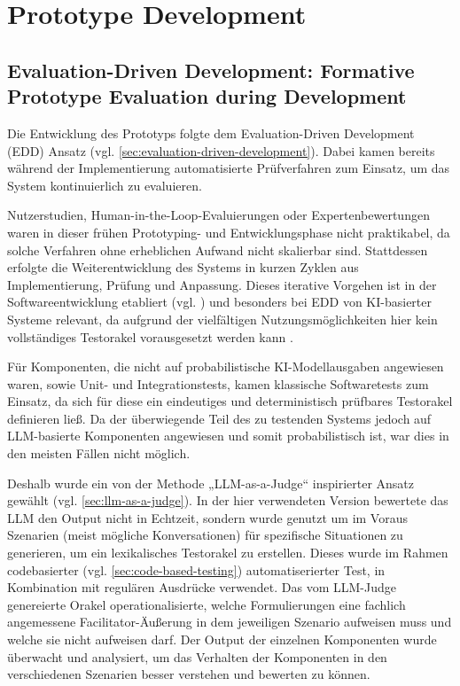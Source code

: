 \section{Prototype Development}

\subsection{Evaluation-Driven Development: Formative Prototype Evaluation during Development}
\label{sec:evaluation-driven-development}

Die Entwicklung des Prototyps folgte dem Evaluation-Driven Development (EDD) Ansatz (vgl.
\autoref{sec:evaluation-driven-development}). Dabei kamen bereits während der Implementierung automatisierte
Prüfverfahren zum Einsatz, um das System kontinuierlich zu evaluieren.

Nutzerstudien, Human-in-the-Loop-Evaluierungen oder Expertenbewertungen waren in dieser frühen Prototyping-
und Entwicklungsphase nicht praktikabel, da solche Verfahren ohne erheblichen Aufwand nicht skalierbar sind.
Stattdessen erfolgte die Weiterentwicklung des Systems in kurzen Zyklen aus Implementierung, Prüfung und
Anpassung. Dieses iterative Vorgehen ist in der Softwareentwicklung etabliert (vgl.
\cite[p.~8]{ottAppsEffektivManagen2019}) und besonders bei EDD von KI-basierter Systeme relevant, da aufgrund
der vielfältigen Nutzungsmöglichkeiten hier kein vollständiges Testorakel vorausgesetzt werden kann
\cite[p.~39]{istqbrISTQBCertifiedTester}.

Für Komponenten, die nicht auf probabilistische KI-Modellausgaben angewiesen waren, sowie Unit- und
Integrationstests, kamen klassische Softwaretests zum Einsatz, da sich für diese ein eindeutiges und
deterministisch prüfbares Testorakel definieren ließ. Da der überwiegende Teil des zu testenden Systems
jedoch auf LLM-basierte Komponenten angewiesen und somit probabilistisch ist, war dies in den meisten Fällen
nicht möglich.

Deshalb wurde ein von der Methode „LLM-as-a-Judge“ inspirierter Ansatz gewählt (vgl.
\autoref{sec:llm-as-a-judge}). In der hier verwendeten Version bewertete das LLM den Output nicht in
Echtzeit, sondern wurde genutzt um im Voraus Szenarien (meist mögliche Konversationen) für spezifische
Situationen zu generieren, um ein lexikalisches Testorakel zu erstellen. Dieses wurde im Rahmen
codebasierter (vgl. \autoref{sec:code-based-testing}) automatiserierter Test, in Kombination mit regulären
Ausdrücke verwendet.
Das vom LLM-Judge genereierte Orakel operationalisierte, welche Formulierungen eine fachlich angemessene
Facilitator-Äußerung in dem jeweiligen Szenario aufweisen muss und welche sie nicht aufweisen darf. Der Output
der einzelnen Komponenten wurde überwacht und analysiert, um das Verhalten der Komponenten in den
verschiedenen Szenarien besser verstehen und bewerten zu können.

